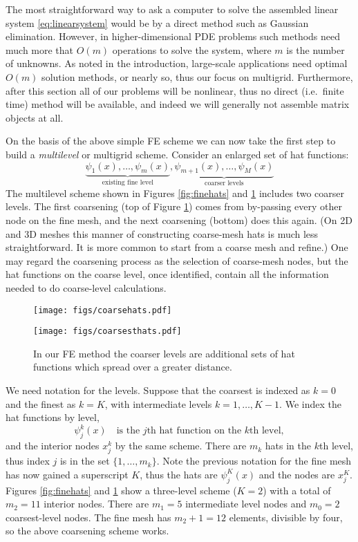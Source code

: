 \documentclass[letterpaper,final,12pt,reqno]{amsart}
\begin{document}
The most straightforward way to ask a computer to solve the assembled linear system \eqref{eq:linearsystem} would be by a direct method such as Gaussian elimination.  However, in higher-dimensional PDE problems such methods need much more that $O(m)$ operations to solve the system, where $m$ is the number of unknowns.  As noted in the introduction, large-scale applications need optimal $O(m)$ solution methods, or nearly so, thus our focus on multigrid.  Furthermore, after this section all of our problems will be nonlinear, thus no direct (i.e.~finite time) method will be available, and indeed we will generally not assemble matrix objects at all.

On the basis of the above simple FE scheme we can now take the first step to build a \emph{multilevel} or multigrid scheme.  Consider an enlarged set of hat functions:
    $$\underbrace{\psi_1(x),\dots,\psi_m(x)}_{\text{existing fine level}},\underbrace{\psi_{m+1}(x),\dots,\psi_M(x)}_{\text{coarser levels}}$$
The multilevel scheme shown in Figures \ref{fig:finehats} and \ref{fig:coarsehats} includes two coarser levels.  The first coarsening (top of Figure \ref{fig:coarsehats}) comes from by-passing every other node on the fine mesh, and the next coarsening (bottom) does this again.  (On 2D and 3D meshes this manner of constructing coarse-mesh hats is much less straightforward.  It is more common to start from a coarse mesh and refine.)  One may regard the coarsening process as the selection of coarse-mesh nodes, but the hat functions on the coarse level, once identified, contain all the information needed to do coarse-level calculations.

\begin{figure}
\texttt{[image: figs/coarsehats.pdf]}
\smallskip

\texttt{[image: figs/coarsesthats.pdf]}
\caption{In our FE method the coarser levels are additional sets of hat functions which spread over a greater distance.}
\label{fig:coarsehats}
\end{figure}

We need notation for the levels.  Suppose that the coarsest is indexed as $k=0$ and the finest as $k=K$, with intermediate levels $k=1,\dots,K-1$.  We index the hat functions by level,
\begin{equation}
  \psi_j^k(x) \quad \text{is the $j$th hat function on the $k$th level},  \label{eq:definepsijk}
\end{equation}
and the interior nodes $x_j^k$ by the same scheme.  There are $m_k$ hats in the $k$th level, thus index $j$ is in the set $\{1,\dots,m_k\}$.  Note the previous notation for the fine mesh has now gained a superscript $K$, thus the hats are $\psi_j^K(x)$ and the nodes are $x_j^K$.  Figures \ref{fig:finehats} and \ref{fig:coarsehats} show a three-level scheme ($K=2$) with a total of $m_2=11$ interior nodes.  There are $m_1=5$ intermediate level nodes and $m_0=2$ coarsest-level nodes.  The fine mesh has $m_2+1=12$ elements, divisible by four, so the above coarsening scheme works.
\end{document}
